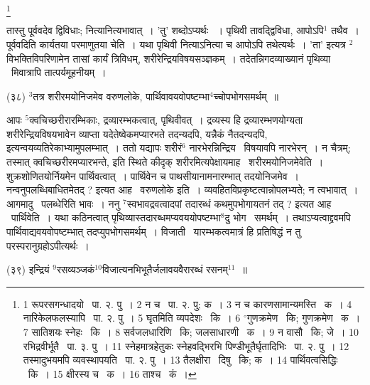\documentclass[11pt, openany]{book}
\newcommand\blfootnote[1]{%
 \begingroup
 \renewcommand\thefootnote{}\footnote{#1}%
 \addtocounter{footnote}{-1}%
 \endgroup
}
\begin{document}
\blfootnote{1 रूपरसगन्धादयो  \textendash\ पा. २. पु~। 2 न च  \textendash\ पा. २. पु; क~। 3 न च कारणसामान्यमस्ति  \textendash\ क~। 4 नारिकेलफलस्यापि \textendash\ पा. २. पु~। 5 घृतमिति व्यपदेशः \textendash\ कि~। 6 ${}^\circ$गुणक्रमेण  \textendash\ कि; गुणक्रमेण \textendash\ क~। 7 सातिशयः स्नेहः \textendash\ कि~। 8 सर्वजलधारिणि  \textendash\ कि; जलसाधारणी  \textendash\ क~। 9 न वासौ  \textendash\ कि; जे~। 10 रभिद्रवीर्भूतै  \textendash\ पा. ३. पु~। 11 स्नेहमात्रहेतुकः स्नेहवद्भिरभि पिण्डीभूतैर्घृतादिभिः \textendash\ पा. २. पु~। 12 तस्मादुभयमपि व्यवस्थापयति \textendash\ पा. २. पु~। 13 तैलक्षीरा  \textendash\ दिषु  \textendash\ कि; क~। 14 पार्थिवत्वसिद्धिः  \textendash\ कि~। 15 क्षीरस्य च  \textendash\ क~। 16 ताश्च  \textendash\ कं~।}

\newpage
{\knu तास्तु पूर्ववदेव द्विविधाः; नित्यानित्यभावात्~।} 'तु' शब्दोऽप्यर्थः ~। पृथिवी तावद्द्विविधा, आपोऽपि$^1$ तथैव~। पूर्ववदिति कार्यतया परमाणुतया चेति~। यथा पृथिवी नित्याऽनित्या च आपोऽपि तथेत्यर्थः~। 'ता' इत्यत्र ${}^2$विभक्तिविपरिणामेन {\knu तासां कार्यं त्रिविधम्, शरीरेन्द्रियविषयसञ्ज्ञकम्~।} तदेतन्निगदव्याख्यानं पृथिव्या \textendash\ मिवात्रापि तात्पर्यमूहनीयम्~।

\begin{sloppypar}
\hangindent=2cm {\knu (३८) ${}^3$तत्र शरीरमयोनिजमेव वरुणलोके, पार्थिवावयवोपष्टम्भा$^4$च्चोपभोगसमर्थम्~॥}
\end{sloppypar}

आपः ${}^5$क्वचिच्छरीरारम्भिकाः, द्रव्यारम्भकत्वात्, पृथिवीवत्~। द्रव्यस्य हि द्रव्यारम्भणयोग्यता शरीरेन्द्रियविषयभावेन व्याप्ता यदेतेष्वेकमप्यारभते तदन्यदपि, यन्नैकं नैतदन्यदपि, इत्यन्वयव्यतिरेकाभ्यामुपलम्भात्~। ततो यद्यापः शरीरं$^6$ नारभेरन्निन्द्रिय \textendash\ विषयावपि नारभेरन्~। न चैत्रम्; तस्मात् क्वचिच्छरीरमप्यारभन्ते, इति स्थिते कीदृक् शरीरमित्यपेक्षायमाह \textendash\ {\knu शरीरमयोनिजमेवेति~।} शुक्रशोणितयोर्नियमेन पार्थिवत्वात्~। पार्थिवेन च पाथसीयानामनारम्भात् तदयोनिजमेव~। नन्वनुपलब्धिबाधितमेतद् ? इत्यत आह \textendash\ {\knu वरुणलोके} इति~। व्यवहितविप्रकृष्टत्वान्नोपलभ्यते; न त्वभावात्~। आगमादु \textendash\ पलब्धेरिति भावः~। ननु ${}^7$स्वभावद्रवत्वादपां तदारब्धं कथमुपभोगायतनं तद् ? इत्यत आह \textendash\ {\knu पार्थिवेति}~। यथा कठिनत्वात् पृथिव्यास्तदारब्धमप्यवययोपष्टम्भा$^8$दु भोग \textendash\ समर्थम्~। तथाऽप्यत्वाद्द्रवमपि पार्थिवाद्यवयवोपष्टम्भात् तदप्युपभोगसमर्थम्~। विजाती \textendash\ यारम्भकत्वमात्रं हि प्रतिषिद्धं न तु परस्परानुग्रहोऽपीत्यर्थः~।

\hangindent=2cm {\knu (३९) इन्द्रियं ${}^9$रसव्यञ्जकं${}^10$विजात्यनभिभूतैर्जलावयवैरारब्धं रसनम्$^11$~॥}
\end{document}
